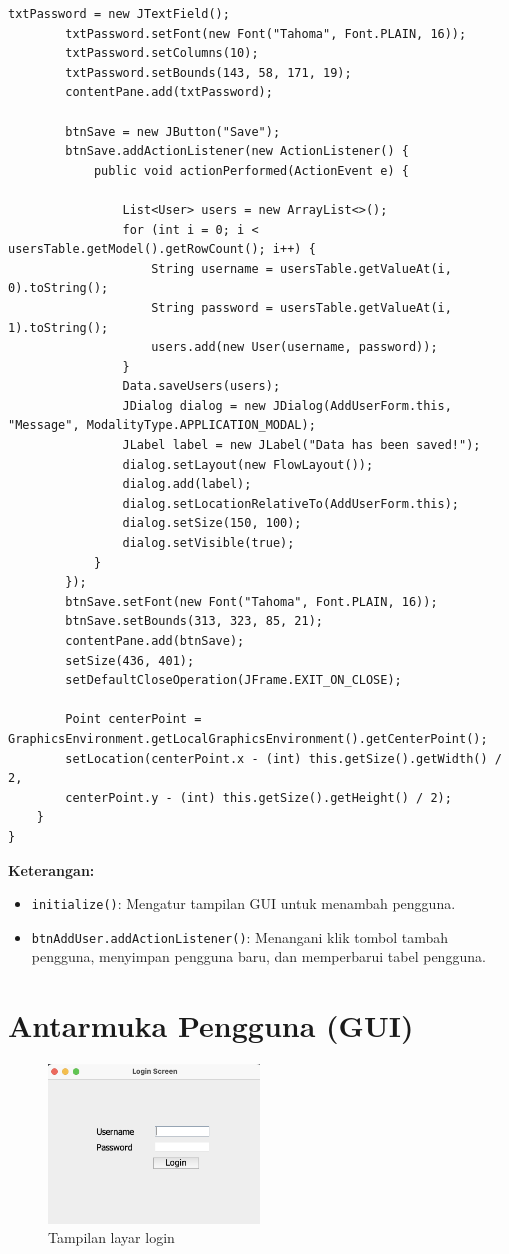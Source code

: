 \begin{lstlisting}[style=JavaStyle]
		txtPassword = new JTextField();
		txtPassword.setFont(new Font("Tahoma", Font.PLAIN, 16));
		txtPassword.setColumns(10);
		txtPassword.setBounds(143, 58, 171, 19);
		contentPane.add(txtPassword);
		
		btnSave = new JButton("Save");
		btnSave.addActionListener(new ActionListener() {
			public void actionPerformed(ActionEvent e) {
				
				List<User> users = new ArrayList<>();
				for (int i = 0; i < usersTable.getModel().getRowCount(); i++) {
					String username = usersTable.getValueAt(i, 0).toString(); 
					String password = usersTable.getValueAt(i, 1).toString();
					users.add(new User(username, password));
				}
				Data.saveUsers(users);
				JDialog dialog = new JDialog(AddUserForm.this, "Message", ModalityType.APPLICATION_MODAL);
				JLabel label = new JLabel("Data has been saved!");
				dialog.setLayout(new FlowLayout());
				dialog.add(label);
				dialog.setLocationRelativeTo(AddUserForm.this);
				dialog.setSize(150, 100);
				dialog.setVisible(true);
			}
		});
		btnSave.setFont(new Font("Tahoma", Font.PLAIN, 16));
		btnSave.setBounds(313, 323, 85, 21);
		contentPane.add(btnSave);
		setSize(436, 401);
		setDefaultCloseOperation(JFrame.EXIT_ON_CLOSE);
		
		Point centerPoint = GraphicsEnvironment.getLocalGraphicsEnvironment().getCenterPoint();
		setLocation(centerPoint.x - (int) this.getSize().getWidth() / 2,
		centerPoint.y - (int) this.getSize().getHeight() / 2);
	}
}

\end{lstlisting}

\textbf{Keterangan:} 
\begin{itemize}
\item \texttt{initialize()}: Mengatur tampilan GUI untuk menambah pengguna.
\item \texttt{btnAddUser.addActionListener()}: Menangani klik tombol tambah pengguna, menyimpan pengguna baru, dan memperbarui tabel pengguna.
\end{itemize}

\section{Antarmuka Pengguna (GUI)}

\begin{figure}[h!]
\centering
\includegraphics[width=0.5\textwidth]{assets/login-screen.png}
\caption{Tampilan layar login}
\label{fig:login-screen}
\end{figure}


